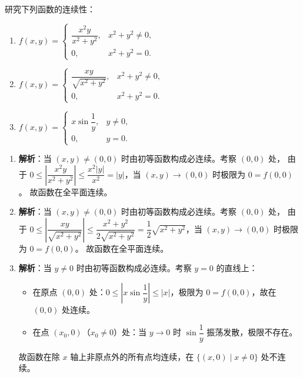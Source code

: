 \documentclass[lang=cn,11pt]{elegantbook}
\begin{document}

\begin{exercise}[分段函数的连续性分析]
研究下列函数的连续性：
\begin{enumerate}
  \item $f(x,y)=\begin{cases}\dfrac{x^2y}{x^2+y^2}, & x^2+y^2 \neq 0,\\[4pt] 0, & x^2+y^2=0.\end{cases}$
  \item $f(x,y)=\begin{cases}\dfrac{xy}{\sqrt{x^2+y^2}}, & x^2+y^2 \neq 0,\\[4pt] 0, & x^2+y^2=0.\end{cases}$
  \item $f(x,y)=\begin{cases}x\sin\dfrac{1}{y}, & y \neq 0,\\[4pt] 0, & y=0.\end{cases}$
\end{enumerate}
\end{exercise}

\begin{solution}
\begin{enumerate}
  \item \textbf{解析}：当 $(x,y) \neq (0,0)$ 时由初等函数构成必连续。考察 $(0,0)$ 处，
  由于 $0 \leq \left|\dfrac{x^2y}{x^2+y^2}\right| \leq \dfrac{x^2|y|}{x^2} = |y|$，当 $(x,y) \to (0,0)$ 时极限为 $0 = f(0,0)$。
  故函数在全平面连续。
  
  \item \textbf{解析}：当 $(x,y) \neq (0,0)$ 时由初等函数构成必连续。考察 $(0,0)$ 处，
  由于 $0 \leq \left|\dfrac{xy}{\sqrt{x^2+y^2}}\right| \leq \dfrac{x^2+y^2}{2\sqrt{x^2+y^2}} = \dfrac{1}{2}\sqrt{x^2+y^2}$，当 $(x,y) \to (0,0)$ 时极限为 $0 = f(0,0)$。
  故函数在全平面连续。
  
  \item \textbf{解析}：当 $y \neq 0$ 时由初等函数构成必连续。考察 $y=0$ 的直线上：
  \begin{itemize}
    \item 在原点 $(0,0)$ 处：$0 \leq \left|x\sin\dfrac{1}{y}\right| \leq |x|$，极限为 $0 = f(0,0)$，故在 $(0,0)$ 处连续。
    \item 在点 $(x_0,0)$（$x_0 \neq 0$）处：当 $y \to 0$ 时 $\sin\dfrac{1}{y}$ 振荡发散，极限不存在。
  \end{itemize}
  故函数在除 $x$ 轴上非原点外的所有点均连续，在 $\{(x,0) \mid x \neq 0\}$ 处不连续。
\end{enumerate}
\end{solution}
\end{document}
